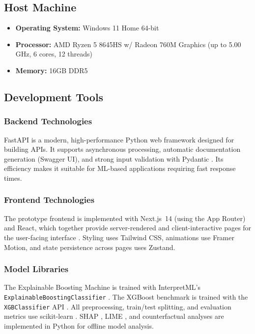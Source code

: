 \documentclass[journal]{./IEEE/IEEEtran}
\begin{document}
\subsection{Host Machine}
\begin{itemize}
    \item \textbf{Operating System:} Windows 11 Home 64-bit
    \item \textbf{Processor:} AMD Ryzen 5 8645HS w/ Radeon 760M Graphics (up to 5.00 GHz, 6 cores, 12 threads)
    \item \textbf{Memory:} 16GB DDR5
\end{itemize}

\subsection{Development Tools}
\subsubsection{Backend Technologies}
FastAPI is a modern, high-performance Python web framework designed for building APIs. It supports asynchronous processing, automatic documentation generation (Swagger UI), and strong input validation with Pydantic \cite{ref21}. Its efficiency makes it suitable for ML-based applications requiring fast response times.

\subsubsection{Frontend Technologies}
The prototype frontend is implemented with Next.js~14 (using the App Router) and React, which together provide server-rendered and client-interactive pages for the user-facing interface \cite{ref22}. Styling uses Tailwind CSS, animations use Framer Motion, and state persistence across pages uses Zustand.

\subsubsection{Model Libraries}
The Explainable Boosting Machine is trained with InterpretML's \texttt{ExplainableBoostingClassifier} \cite{ref15}. The XGBoost benchmark is trained with the \texttt{XGBClassifier} API \cite{ref16}. All preprocessing, train/test splitting, and evaluation metrics use scikit-learn \cite{ref74}. SHAP \cite{ref18}, LIME \cite{ref19}, and counterfactual analyses \cite{ref20} are implemented in Python for offline model analysis.
\end{document}
